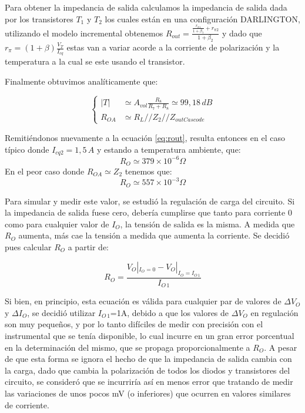 \documentclass[e2_tp1_main.tex]{subfiles}
\begin{document}
Para obtener la impedancia de salida calculamos la impedancia de salida dada por los transistores $T_1$ y $T_2$ los cuales están en una configuración DARLINGTON, utilizando el modelo incremental obtenemos $R_{out}=\frac{\frac{r_{\pi1}}{1+\beta_1}+r_{\pi2}}{1+\beta_2}$ y dado que $r_{\pi}=(1+\beta)\frac{V_T}{I_{cq}}$ estas van a variar acorde a la corriente de polarización y la temperatura a la cual se este usando el transistor. 

Finalmente obtuvimos anal\'iticamente que:

\begin{equation}
	\left\{
	\begin{aligned}
	|T| &\simeq{}A_{vol}\frac{R_8}{R_7+R_8}\simeq{}99,18\,dB\\
	R_{OA} &\simeq{}R_L//Z_2//Z_{outCascode}
	\end{aligned}
	\right.
\end{equation}

Remiti\'endonos nuevamente a la ecuaci\'on \ref{eq:rout}, resulta entonces en el caso típico donde $I_{cq2}=1,5\,A$ y estando a temperatura ambiente, que:
$$R_O \simeq 379\times 10^{-6}\Omega$$
En el peor caso donde $R_{OA}\simeq{}Z_2$ tenemos que:
$$R_O \simeq 557\times 10^{-3}\Omega$$

Para simular y medir este valor, se estudi\'o la regulaci\'on de carga del circuito. Si la impedancia de salida fuese cero, deber\'ia cumplirse que tanto para corriente 0 como para cualquier valor de $I_O$, la tensi\'on de salida es la misma. A medida que $R_O$ aumenta, m\'as cae la tensi\'on a medida que aumenta la corriente. Se decidi\'o pues calcular $R_O$ a partir de:

\begin{equation}
	R_O = \frac{V_O|_{I_O=0} - V_O|_{I_O=I_{O\,1}}}{I_{O\,1}}
\end{equation} 

Si bien, en principio, esta ecuaci\'on es v\'alida para cualquier par de valores de $\Delta V_O$ y $\Delta I_O$, se decidi\'o utilizar $I_{O\,1}$=1A, debido a que los valores de $\Delta V_O$ en regulaci\'on son muy peque\~nos, y por lo tanto dif\'iciles de medir con precisi\'on con el instrumental que se ten\'ia disponible, lo cual incurre en un gran error porcentual en la determinaci\'on del mismo, que se propaga proporcionalmente a $R_O$. A pesar de que esta forma se ignora el hecho de que la impedancia de salida cambia con la carga, dado que cambia la polarizaci\'on de todos los diodos y transistores del circuito, se consider\'o que se incurrir\'ia as\'i en menos error que tratando de medir las variaciones de unos pocos mV (o inferiores) que ocurren en valores similares de corriente.
\end{document}
